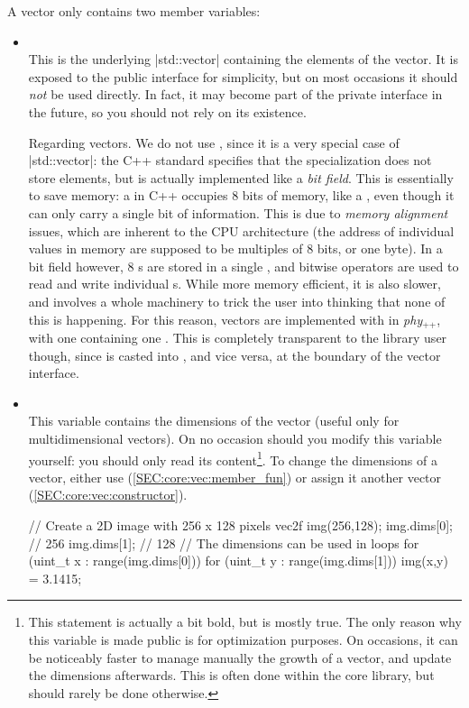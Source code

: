 \documentclass[12pt,a4paper]{report}
\newcommand{\phypp}{\textit{phy}$_{\text{++}}$\xspace}
\newcommand{\stdvec}{\cppinline|std::vector|\xspace}
\newenvironment{advanced}
{
    \begin{mdframed}[style=advanced,frametitle={Advanced}]
}
{
    \end{mdframed}
}
\newenvironment{example}
{
    \begin{mdframed}[style=example,frametitle={Example}]
}
{
    \end{mdframed}
}
\newcommand{\cppbool}{\cppinline{bool}\xspace}
\newcommand{\cppbools}{\cppinline{bool}s\xspace}
\begin{document}
A vector only contains two member variables:
\begin{itemize}
\item {} \\ This is the underlying \stdvec containing the elements of the vector. It is exposed to the public interface for simplicity, but on most occasions it should \emph{not} be used directly. In fact, it may become part of the private interface in the future, so you should not rely on its existence.

\begin{advanced}
Regarding \cppbool vectors. We do not use , since it is a very special case of \stdvec: the C++ standard specifies that the \cppbool specialization does not store \cppbool elements, but is actually implemented like a \emph{bit field}. This is essentially to save memory: a \cppbool in C++ occupies $8$ bits of memory, like a , even though it can only carry a single bit of information. This is due to \emph{memory alignment} issues, which are inherent to the CPU architecture (the address of individual values in memory are supposed to be multiples of $8$ bits, or one byte). In a bit field however, $8$ \cppbools are stored in a single , and bitwise operators are used to read and write individual \cppbools. While more memory efficient, it is also slower, and involves a whole machinery to trick the user into thinking that none of this is happening. For this reason, \cppbool vectors are implemented with  in \phypp, with one  containing one \cppbool. This is completely transparent to the library user though, since  is casted into , and vice versa, at the boundary of the vector interface.
\end{advanced}

\item {} \\ This variable contains the dimensions of the vector (useful only for multidimensional vectors). On no occasion should you modify this variable yourself: you should only read its content\footnote{This statement is actually a bit bold, but is mostly true. The only reason why this variable is made public is for optimization purposes. On occasions, it can be noticeably faster to manage manually the growth of a vector, and update the dimensions afterwards. This is often done within the core library, but should rarely be done otherwise.}. To change the dimensions of a vector, either use  (\ref{SEC:core:vec:member_fun}) or assign it another vector (\ref{SEC:core:vec:constructor}).

\begin{example}
\begin{cppcode}
// Create a 2D image with 256 x 128 pixels
vec2f img(256,128);
img.dims[0]; // 256
img.dims[1]; // 128
// The dimensions can be used in loops
for (uint_t x : range(img.dims[0]))
for (uint_t y : range(img.dims[1])) {
    img(x,y) = 3.1415;
}
\end{cppcode}
\end{example}
\end{itemize}
\end{document}
